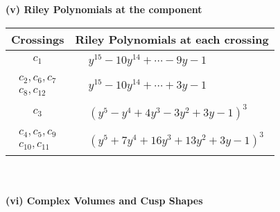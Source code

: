 \documentclass[1p]{elsarticle_modified}
\theoremstyle{definition}
\begin{document}
\newpage\renewcommand{\arraystretch}{1}
\flushleft \textbf{(v) Riley Polynomials at the component}\newline \\
\begin{tabular}{m{50pt}|m{274pt}}
Crossings & \hspace{64pt}Riley Polynomials at each crossing \\
\hline $$\begin{aligned}c_{1}\end{aligned}$$&$\begin{aligned}
&y^{15}-10 y^{14}+\cdots-9 y-1
\end{aligned}$\\
\hline $$\begin{aligned}c_{2},c_{6},c_{7}\\c_{8},c_{12}\end{aligned}$$&$\begin{aligned}
&y^{15}-10 y^{14}+\cdots+3 y-1
\end{aligned}$\\
\hline $$\begin{aligned}c_{3}\end{aligned}$$&$\begin{aligned}
&(y^5- y^4+4 y^3-3 y^2+3 y-1)^3
\end{aligned}$\\
\hline $$\begin{aligned}c_{4},c_{5},c_{9}\\c_{10},c_{11}\end{aligned}$$&$\begin{aligned}
&(y^5+7 y^4+16 y^3+13 y^2+3 y-1)^3
\end{aligned}$\\
\hline
\end{tabular}\\~\\
\newpage\flushleft \textbf{(vi) Complex Volumes and Cusp Shapes}
\end{document}
